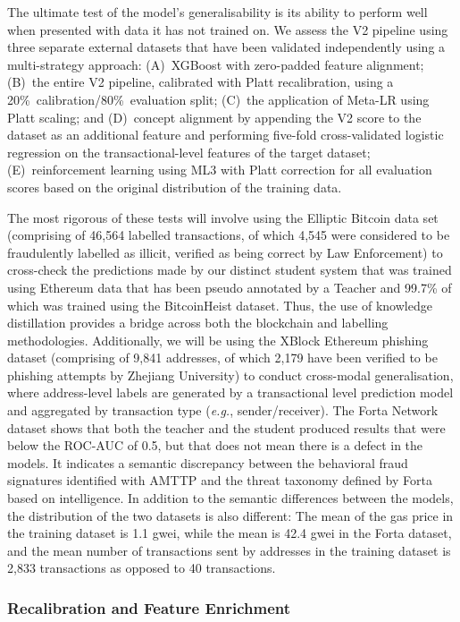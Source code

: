 \documentclass[journal]{IEEEtran}
\newcommand{\eg}{\textit{e.g.}}
\begin{document}
The ultimate test of the model's generalisability is its ability to perform well when presented with data it has not trained on. We assess the V2 pipeline using three separate external datasets that have been validated independently using a multi-strategy approach: (A)~XGBoost with zero-padded feature alignment; (B)~the entire V2 pipeline, calibrated with Platt recalibration, using a 20\%~calibration/80\%~evaluation split; (C)~the application of Meta-LR using Platt scaling; and (D)~concept alignment by appending the V2 score to the dataset as an additional feature and performing five-fold cross-validated logistic regression on the transactional-level features of the target dataset; (E)~reinforcement learning using ML3 with Platt correction for all evaluation scores based on the original distribution of the training data.

The most rigorous of these tests will involve using the Elliptic Bitcoin data set (comprising of 46,564 labelled transactions, of which 4,545 were considered to be fraudulently labelled as illicit, verified as being correct by Law Enforcement) to cross-check the predictions made by our distinct student system that was trained using Ethereum data that has been pseudo annotated by a Teacher and 99.7\% of which was trained using the BitcoinHeist dataset. Thus, the use of knowledge distillation provides a bridge across both the blockchain and labelling methodologies. Additionally, we will be using the XBlock Ethereum phishing dataset (comprising of 9,841 addresses, of which 2,179 have been verified to be phishing attempts by Zhejiang University) to conduct cross-modal generalisation, where address-level labels are generated by a transactional level prediction model and aggregated by transaction type (\eg, sender/receiver). The Forta Network dataset shows that both the teacher and the student produced results that were below the ROC-AUC of 0.5, but that does not mean there is a defect in the models. It indicates a semantic discrepancy between the behavioral fraud signatures identified with AMTTP and the threat taxonomy defined by Forta based on intelligence. In addition to the semantic differences between the models, the distribution of the two datasets is also different: The mean of the gas price in the training dataset is 1.1 gwei, while the mean is 42.4 gwei in the Forta dataset, and the mean number of transactions sent by addresses in the training dataset is 2,833 transactions as opposed to 40 transactions.

\subsubsection{Recalibration and Feature Enrichment}
\end{document}
